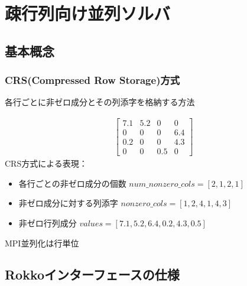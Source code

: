 \section{疎行列向け並列ソルバ}

\subsection*{基本概念}

\begin{frame}[c,fragile]
  \frametitle{CRS(Compressed Row Storage)方式}
各行ごとに非ゼロ成分とその列添字を格納する方法

\begin{rei}%
\vspace{-2\baselineskip}
\begin{align*}
\begin{bmatrix}
7.1 & 5.2 & 0 & 0 \\
0 & 0 & 0 & 6.4 \\
0.2 & 0 & 0 & 4.3 \\
0 & 0 & 0.5 & 0
\end{bmatrix}
\end{align*}
CRS方式による表現：
\begin{itemize}
\item 各行ごとの非ゼロ成分の個数 $num\_nonzero\_cols = [2, 1, 2, 1]$
\item 非ゼロ成分に対する列添字 $nonzero\_cols = [1, 2, 4, 1, 4, 3]$
\item 非ゼロ行列成分 $values = [7.1, 5.2, 6.4, 0.2, 4.3, 0.5]$
\end{itemize}
\end{rei}

MPI並列化は行単位

\end{frame}

\subsection*{Rokkoインターフェースの仕様}


